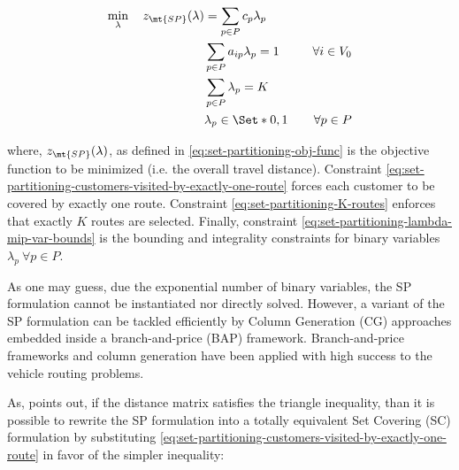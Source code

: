 \begin{align}
	\min_{\lambda} \quad z_\mt{SP}(\lambda) & = \sum_{p \in P}  c_p \lambda_p \label{eq:set-partitioning-obj-func}                                                                                                                                           \\
	                                        & \sum_{p \in P}  a_{ip} \lambda_p = 1                                 & \quad \forall i \in V_0                                              \label{eq:set-partitioning-customers-visited-by-exactly-one-route} \\
	                                        & \sum_{p \in P} \lambda_{p} = K\label{eq:set-partitioning-K-routes}                                                                                                                                             \\
	                                        & \lambda_p                    \in \Set*{0, 1}                         & \quad \forall p \in P \label{eq:set-partitioning-lambda-mip-var-bounds}
\end{align}

where, $z_\mt{SP}(\lambda)$, as defined in \eqref{eq:set-partitioning-obj-func} is the objective function to be minimized (i.e. the overall travel distance).
Constraint \eqref{eq:set-partitioning-customers-visited-by-exactly-one-route} forces each customer to be covered by exactly one route.
Constraint \eqref{eq:set-partitioning-K-routes} enforces that exactly $K$ routes are selected.
Finally, constraint \eqref{eq:set-partitioning-lambda-mip-var-bounds} is the bounding and integrality constraints for binary variables $\lambda_p \ \forall p \in P$.

As one may guess, due the exponential number of binary variables, the SP formulation cannot be instantiated nor directly solved.
However, a variant of the SP formulation can be tackled efficiently by Column Generation (CG) approaches embedded inside a branch-and-price (BAP) framework.
Branch-and-price frameworks and column generation have been applied with high success to the vehicle routing problems.


As, \textcite{toth2002} points out, if the distance matrix satisfies the triangle inequality,
than it is possible to rewrite the SP formulation into a totally equivalent Set Covering (SC) formulation
by substituting \cref{eq:set-partitioning-customers-visited-by-exactly-one-route} in favor of the simpler inequality:

